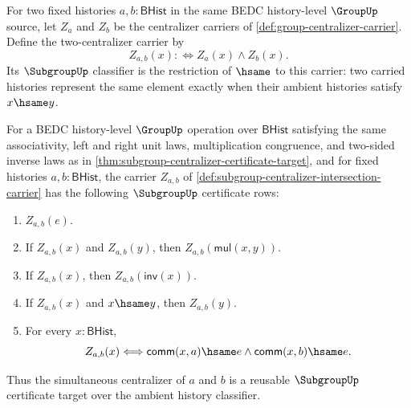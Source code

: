 \begin{definition}
\label{def:subgroup-centralizer-intersection-carrier}
For two fixed histories $a,b:\mathsf{BHist}$ in the same BEDC
history-level $\GroupUp$ source, let $Z_a$ and $Z_b$ be the centralizer
carriers of \autoref{def:group-centralizer-carrier}. Define the
two-centralizer carrier by
$$
Z_{a,b}(x) :\Longleftrightarrow Z_a(x)\land Z_b(x).
$$
Its $\SubgroupUp$ classifier is the restriction of $\hsame$ to this
carrier: two carried histories represent the same element exactly when their
ambient histories satisfy $x\hsame y$.
\end{definition}

\begin{theorem}
\label{thm:subgroup-centralizer-intersection-certificate}
For a BEDC history-level $\GroupUp$ operation over $\mathsf{BHist}$
satisfying the same associativity, left and right unit laws, multiplication
congruence, and two-sided inverse laws as in
\autoref{thm:subgroup-centralizer-certificate-target}, and for fixed histories
$a,b:\mathsf{BHist}$, the carrier $Z_{a,b}$ of
\autoref{def:subgroup-centralizer-intersection-carrier} has the following
$\SubgroupUp$ certificate rows:
\begin{enumerate}
\item $Z_{a,b}(e)$.
\item If $Z_{a,b}(x)$ and $Z_{a,b}(y)$, then
$Z_{a,b}(\mathsf{mul}(x,y))$.
\item If $Z_{a,b}(x)$, then $Z_{a,b}(\mathsf{inv}(x))$.
\item If $Z_{a,b}(x)$ and $x\hsame y$, then $Z_{a,b}(y)$.
\item For every $x:\mathsf{BHist}$,
$$
Z_{a,b}(x) \Longleftrightarrow
\mathsf{comm}(x,a)\hsame e\land \mathsf{comm}(x,b)\hsame e.
$$
\end{enumerate}
Thus the simultaneous centralizer of $a$ and $b$ is a reusable
$\SubgroupUp$ certificate target over the ambient history classifier.
\end{theorem}
